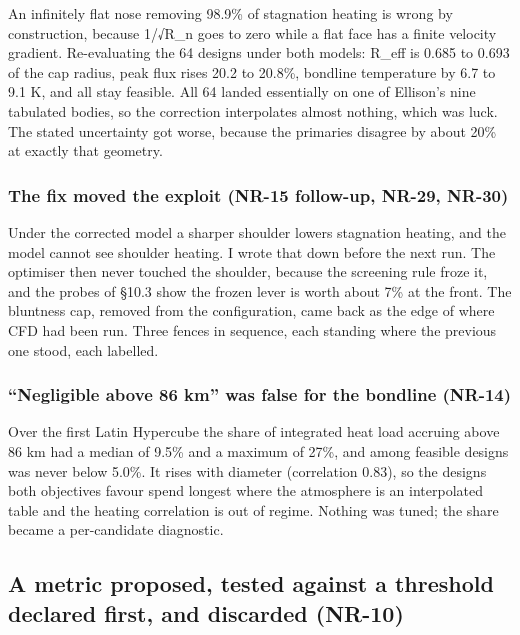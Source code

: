 \documentclass[
  a4paper,
  11pt]{article}
\begin{document}
An infinitely flat nose removing 98.9\% of stagnation heating is wrong
by construction, because 1/√R\_n goes to zero while a flat face has a
finite velocity gradient. Re-evaluating the 64 designs under both
models: R\_eff is 0.685 to 0.693 of the cap radius, peak flux rises 20.2
to 20.8\%, bondline temperature by 6.7 to 9.1 K, and all stay feasible.
All 64 landed essentially on one of Ellison's nine tabulated bodies, so
the correction interpolates almost nothing, which was luck. The stated
uncertainty got worse, because the primaries disagree by about 20\% at
exactly that geometry.

\subsubsection{The fix moved the exploit (NR-15 follow-up, NR-29,
NR-30)}\label{the-fix-moved-the-exploit-nr-15-follow-up-nr-29-nr-30}

Under the corrected model a sharper shoulder lowers stagnation heating,
and the model cannot see shoulder heating. I wrote that down before the
next run. The optimiser then never touched the shoulder, because the
screening rule froze it, and the probes of §10.3 show the frozen lever
is worth about 7\% at the front. The bluntness cap, removed from the
configuration, came back as the edge of where CFD had been run. Three
fences in sequence, each standing where the previous one stood, each
labelled.

\subsubsection{``Negligible above 86 km'' was false for the bondline
(NR-14)}\label{negligible-above-86-km-was-false-for-the-bondline-nr-14}

Over the first Latin Hypercube the share of integrated heat load
accruing above 86 km had a median of 9.5\% and a maximum of 27\%, and
among feasible designs was never below 5.0\%. It rises with diameter
(correlation 0.83), so the designs both objectives favour spend longest
where the atmosphere is an interpolated table and the heating
correlation is out of regime. Nothing was tuned; the share became a
per-candidate diagnostic.

\subsection{A metric proposed, tested against a threshold declared
first, and discarded (NR-10)}
\end{document}
